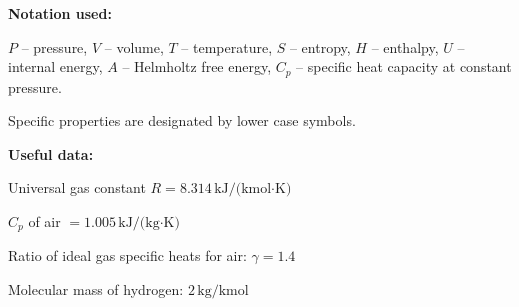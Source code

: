\documentclass[12pt]{article}
\begin{document}
\textbf{Notation used: } 

$P$ – pressure, $V$ – volume, $T$ – temperature, $S$ – entropy, $H$ – enthalpy, $U$ – internal energy, $A$ – Helmholtz free energy, $C_p$ – specific heat capacity at constant pressure.  

Specific properties are designated by lower case symbols.  

\textbf{Useful data:}  

Universal gas constant $R = 8.314 \, \text{kJ/(kmol·K)}$  

$C_p$ of air $= 1.005 \, \text{kJ/(kg·K)}$  

Ratio of ideal gas specific heats for air: $\gamma = 1.4$  

Molecular mass of hydrogen: $2 \, \text{kg/kmol}$  
\end{document}
